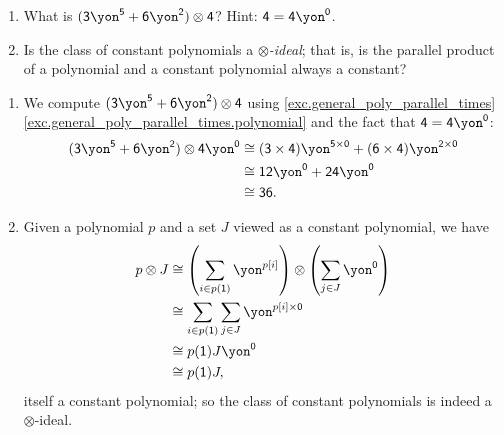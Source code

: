 \documentclass[Book-Poly]{subfiles}
\begin{document}
\begin{exercise}
  \begin{enumerate}
    \item What is $(\3\yon^\5+\6\yon^\2)\otimes\4$? Hint: $\4=\4\yon^\0$.
    \item Is the class of constant polynomials a \emph{$\otimes$-ideal}; that is, is the parallel product of a polynomial and a constant polynomial always a constant? \qedhere
  \end{enumerate}
  \begin{solution}
    \begin{enumerate}
      \item We compute $(\3\yon^\5+\6\yon^\2)\otimes\4$ using \cref{exc.general_poly_parallel_times} \cref{exc.general_poly_parallel_times.polynomial} and the fact that $\4=\4\yon^\0$:
      \begin{align*}
        (\3\yon^\5+\6\yon^\2)\otimes\4\yon^\0 &\iso (\3\times\4)\yon^{\5\times\0} + (\6\times\4)\yon^{\2\times\0} \\
        &\iso \1\2\yon^\0 + \2\4\yon^\0 \\
        &\iso \3\6.
      \end{align*}
      \item Given a polynomial $p$ and a set $J$ viewed as a constant polynomial, we have
      \begin{align*}
        p\otimes J &\iso \left(\sum_{i\in p(\1)}\yon^{p[i]}\right)\otimes\left(\sum_{j\in J}\yon^\0\right) \\
        &\iso \sum_{i\in p(\1)}\sum_{j\in J}\yon^{p[i]\times\0} \\
        &\iso p(\1)J\yon^\0 \\
        &\iso p(\1)J,
      \end{align*}
      itself a constant polynomial; so the class of constant polynomials is indeed a $\otimes$-ideal.
    \end{enumerate}
  \end{solution}
\end{exercise}

\end{document}
